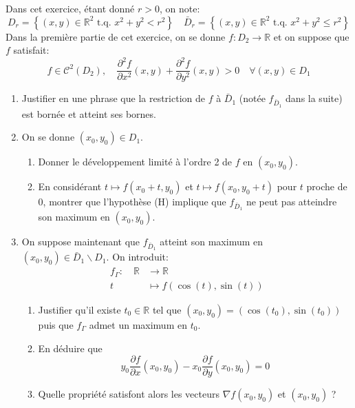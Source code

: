 \documentclass{tp_um}
\begin{document}
\exo{} Dans cet exercice, étant donné $r>0$, on note:
\[
D_{r}=\left\{(x, y) \in \mathbb{R}^{2} \text { t.q. } x^{2}+y^{2}<r^{2}\right\} \quad \bar{D}_{r}=\left\{(x, y) \in \mathbb{R}^{2} \text { t.q. } x^{2}+y^{2} \leq r^{2}\right\}
\]
Dans la première partie de cet exercice, on se donne $f: D_{2} \rightarrow \mathbb{R}$ et on suppose que $f$ satisfait:
\begin{equation}\label{eq.hyp}\tag{H}
    f \in \mathcal{C}^{2}\left(D_{2}\right), \quad \frac{\partial^{2} f}{\partial x^{2}}(x, y)+\frac{\partial^{2} f}{\partial y^{2}}(x, y)>0 \quad \forall(x, y) \in D_{1}
\end{equation}
\begin{enumerate}
    \item Justifier en une phrase que la restriction de $f$ à $\bar{D}_{1}$ (notée $f_{\bar{D}_{1}}$ dans la suite) est bornée et atteint ses bornes.
        \cor{

        }
    \item On se donne $\left(x_{0}, y_{0}\right) \in D_{1}$.
        \begin{enumerate}
            \item  Donner le développement limité à l'ordre 2 de $f$ en $\left(x_{0}, y_{0}\right)$.
            \item  En considérant $t \mapsto f\left(x_{0}+t, y_{0}\right)$ et $t \mapsto f\left(x_{0}, y_{0}+t\right)$ pour $t$ proche de 0, montrer que l'hypothèse (H) implique que $f_{\bar{D}_{1}}$ ne peut pas atteindre son maximum en $\left(x_{0}, y_{0}\right)$.
        \end{enumerate}
    \item  On suppose maintenant que $f_{\bar{D}_{1}}$ atteint son maximum en $\left(x_{0}, y_{0}\right) \in \bar{D}_{1} \backslash D_{1} .$ On introduit:
        \[
            \begin{aligned}
                f_{\Gamma}: \quad \mathbb{R} & \longrightarrow \mathbb{R} \\
                t & \longmapsto f(\cos (t), \sin (t))
            \end{aligned}
        \]
        \begin{enumerate}
            \item Justifier qu'il existe $t_{0} \in \mathbb{R}$ tel que $\left(x_{0}, y_{0}\right)=\left(\cos \left(t_{0}\right), \sin \left(t_{0}\right)\right)$ puis que $f_{\Gamma}$ admet un maximum en $t_{0}$.
            \item En déduire que
                \[
                    y_{0} \frac{\partial f}{\partial x}\left(x_{0}, y_{0}\right)-x_{0} \frac{\partial f}{\partial y}\left(x_{0}, y_{0}\right)=0
                \]
            \item  Quelle propriété satisfont alors les vecteurs $\nabla f\left(x_{0}, y_{0}\right)$ et $\left(x_{0}, y_{0}\right)$ ?
        \end{enumerate}
\end{enumerate}
\end{document}
